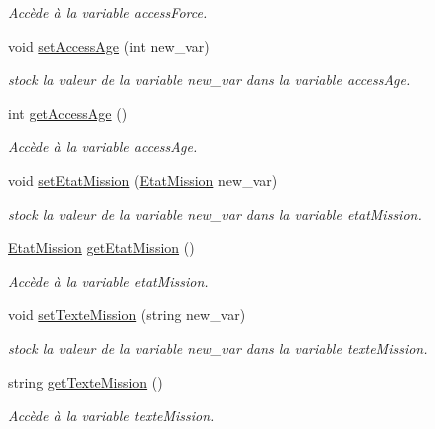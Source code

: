 \begin{DoxyCompactItemize}
\begin{DoxyCompactList}\small\item\em Accède à la variable access\-Force. \end{DoxyCompactList}\item 
void \hyperlink{class_mission_aac3bc744de87abea4e87db51616dfec5}{set\-Access\-Age} (int new\-\_\-var)
\begin{DoxyCompactList}\small\item\em stock la valeur de la variable new\-\_\-var dans la variable access\-Age. \end{DoxyCompactList}\item 
int \hyperlink{class_mission_a3ce0c4da70204a7bd84f9acb6306e43e}{get\-Access\-Age} ()
\begin{DoxyCompactList}\small\item\em Accède à la variable access\-Age. \end{DoxyCompactList}\item 
void \hyperlink{class_mission_a5ee38d2b67b7f860fb6a27d486200bec}{set\-Etat\-Mission} (\hyperlink{mission_8hpp_ace9df1e8554ba5a57340fb42cee370f7}{Etat\-Mission} new\-\_\-var)
\begin{DoxyCompactList}\small\item\em stock la valeur de la variable new\-\_\-var dans la variable etat\-Mission. \end{DoxyCompactList}\item 
\hyperlink{mission_8hpp_ace9df1e8554ba5a57340fb42cee370f7}{Etat\-Mission} \hyperlink{class_mission_aa513084d347dc1c4c8a957258c9d3876}{get\-Etat\-Mission} ()
\begin{DoxyCompactList}\small\item\em Accède à la variable etat\-Mission. \end{DoxyCompactList}\item 
void \hyperlink{class_mission_afc0e70a63822f561abf3a7e832f086af}{set\-Texte\-Mission} (string new\-\_\-var)
\begin{DoxyCompactList}\small\item\em stock la valeur de la variable new\-\_\-var dans la variable texte\-Mission. \end{DoxyCompactList}\item 
string \hyperlink{class_mission_ad6b21ef20ff04bad9769f3b50a3b1218}{get\-Texte\-Mission} ()
\begin{DoxyCompactList}\small\item\em Accède à la variable texte\-Mission. \end{DoxyCompactList}\item 

\end{DoxyCompactItemize}
